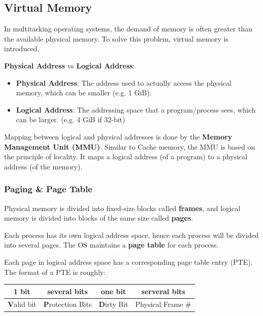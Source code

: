 \subsection{Virtual Memory}

In multitasking operating systems, the demand of memory is often greater than the
available physical memory. To solve this problem, virtual memory is introduced.

\textbf{Physical Address} vs \textbf{Logical Address}:
\begin{itemize}
    \item \textbf{Physical Address}: The address used to actually access the physical memory, which can be smaller (e.g. 1 GiB).
    \item \textbf{Logical Address}: The addressing space that a program/process sees, which can be larger. (e.g. 4 GiB if 32-bit)
\end{itemize}

Mapping between logical and physical addresses is done by the \textbf{Memory Management Unit (MMU)}.
Similar to Cache memory, the MMU is based on the principle of locality.
It maps a logical address (of a program) to a physical address (of the memory).

\subsubsection{Paging \& Page Table}

Physical memory is divided into fixed-size blocks called \textbf{frames},
and logical memory is divided into blocks of the same size called \textbf{pages}.

Each process has its own logical address space, hence each process will be divided
into several pages. The OS maintains a \textbf{page table} for each process.

Each page in logical address space has a corresponding page table entry (PTE).
The format of a PTE is roughly:

\begin{table}[H]
    \centering
    \begin{tabular}{cccc}
    1 bit                                & several bits                              & one bit                                         & serveral bits                          \\ \hline
    \multicolumn{1}{|c|}{\textbf{V}alid bit} & \multicolumn{1}{c|}{\textbf{P}rotection Bits} & \multicolumn{1}{c|}{\textbf{D}irty Bit} & \multicolumn{1}{c|}{Physical Frame \#} \\ \hline           
    \end{tabular}
\end{table}

